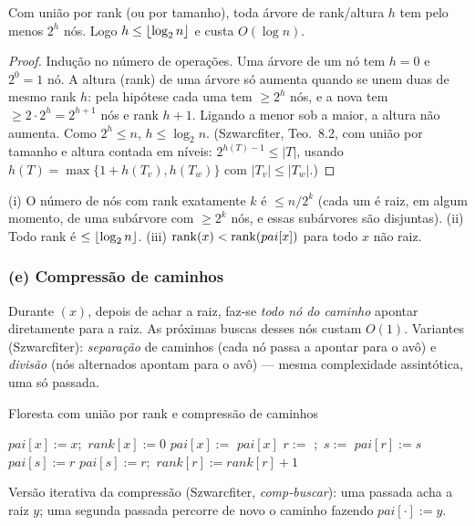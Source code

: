\begin{teo}\label{teo:ufaltura}
Com união por rank (ou por tamanho), toda árvore de rank/altura $h$ tem pelo menos $2^h$ nós. Logo $h\le\lfloor\log_2 n\rfloor$ e \Find{} custa $O(\log n)$.
\end{teo}
\begin{proof}
Indução no número de operações. Uma árvore de um nó tem $h=0$ e $2^0=1$ nó. A altura (rank) de uma árvore só aumenta quando se unem duas de mesmo rank $h$: pela hipótese cada uma tem $\ge2^h$ nós, e a nova tem $\ge 2\cdot2^h=2^{h+1}$ nós e rank $h+1$. Ligando a menor sob a maior, a altura não aumenta. Como $2^h\le n$, $h\le\log_2 n$.
(Szwarcfiter, Teo.~8.2, com união por tamanho e altura contada em níveis: $2^{h(T)-1}\le|T|$, usando $h(T)=\max\{1+h(T_v),h(T_w)\}$ com $|T_v|\le|T_w|$.)
\end{proof}

\begin{cor}
(i) O número de nós com rank exatamente $k$ é $\le n/2^k$ (cada um é raiz, em algum momento, de uma subárvore com $\ge2^k$ nós, e essas subárvores são disjuntas). (ii) Todo rank é $\le\lfloor\log_2n\rfloor$. (iii) $\operatorname{rank}(x)<\operatorname{rank}(pai[x])$ para todo $x$ não raiz.
\end{cor}

\subsubsection*{(e) Compressão de caminhos}
Durante \Find$(x)$, depois de achar a raiz, faz-se \emph{todo nó do caminho} apontar diretamente para a raiz. As próximas buscas desses nós custam $O(1)$. Variantes (Szwarcfiter): \emph{separação} de caminhos (cada nó passa a apontar para o avô) e \emph{divisão} (nós alternados apontam para o avô) --- mesma complexidade assintótica, uma só passada.

\begin{pseudo}{Floresta com união por rank e compressão de caminhos}
\begin{algorithmic}
 \State $pai[x]:=x$;\ $rank[x]:=0$ \EndProcedure
{}
   \State $pai[x]:=$  
  \EndIf
  \State \Return $pai[x]$
\EndFunction
{}
  \State $r:=$ ;\ $s:=$ 
   \Return \EndIf
   \State $pai[r]:=s$
   \State $pai[s]:=r$
  \Else \State $pai[s]:=r$;\ $rank[r]:=rank[r]+1$
  \EndIf
\EndProcedure
\end{algorithmic}
\end{pseudo}
Versão iterativa da compressão (Szwarcfiter, \emph{comp-buscar}): uma passada acha a raiz $y$; uma segunda passada percorre de novo o caminho fazendo $pai[\cdot]:=y$.

